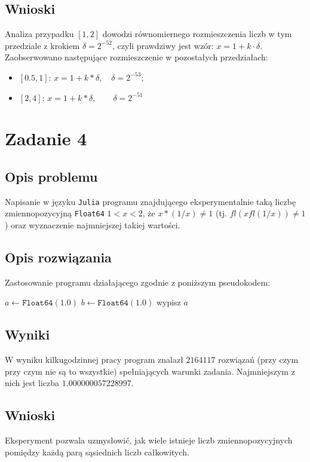 \documentclass{classrep}
\begin{document}
	\subsection{Wnioski}
		Analiza przypadku $[1,2]$ dowodzi równomiernego rozmieszczenia liczb w tym przedziale z krokiem $\delta = 
		2^{-52}$, czyli prawdziwy jest wzór: $x=1+k\cdot\delta$. Zaobserwowano następujące rozmieszczenie w pozostałych 
		przedziałach:
		\begin{itemize}
			\item $[0.5,1]$: $x=1+k*\delta, \quad \delta = 2^{-53}$;
			\item $[2,4]$: $x=1+k*\delta, \qquad \delta = 2^{-51}$
		\end{itemize}
\section{Zadanie 4}
	\subsection{Opis problemu}
		Napisanie w języku \texttt{Julia} programu znajdującego eksperymentalnie taką liczbę zmiennopozycyjną 
		\texttt{Float64} $1<x<2$, że $x*(1/x)\neq1$ (tj. $fl(xfl(1/x))\neq1$) oraz wyznaczenie najmniejszej takiej
		wartości.
	\subsection{Opis rozwiązania}
		Zastosowanie programu działającego zgodnie z poniższym pseudokodem:
		\begin{algorithm}
		\begin{algorithmic}
			\State $a\gets \texttt{Float64}(1.0)$
			\State $b\gets \texttt{Float64}(1.0)$
					wypisz $a$
				\EndIf
			\EndWhile
		\end{algorithmic}
		\caption{}
		\end{algorithm}
		
	\subsection{Wyniki}
		W wyniku kilkugodzinnej pracy program znalazł $2164117$ rozwiązań (przy czym przy czym nie są to wszystkie) spełniających warunki zadania. Najmniejszym z nich jest liczba $1.000000057228997$.
	\subsection{Wnioski}
		Eksperyment pozwala uzmysłowić, jak wiele istnieje liczb zmiennopozycyjnych pomiędzy każdą parą sąsiednich liczb 
		całkowitych.
\end{document}
